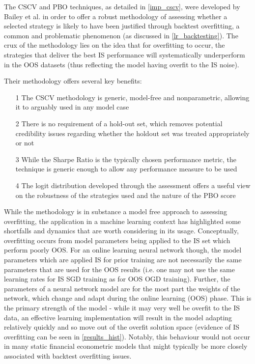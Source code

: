 \documentclass[a4paper,11pt,oneside]{article}
\theoremstyle{plain}
\theoremstyle{definition}
\begin{document}
	The CSCV and PBO techniques, as detailed in \ref{imp_cscv}, were developed by Bailey et al. \cite{BailyPBO} in order to offer a robust methodology of assessing whether a selected strategy is likely to have been justified through backtest overfitting, a common and problematic phenomenon (as discussed in \ref{lr_backtesting}). The crux of the methodology lies on the idea that for overfitting to occur, the strategies that deliver the best IS performance will systematically underperform in the OOS datasets (thus reflecting the model having overfit to the IS noise).\newline
	
	Their methodology offers several key benefits:
	\begin{itemize}
		\item[1] The CSCV methodology is generic, model-free and nonparametric, allowing it to arguably used in any model case
		\item[2] There is no requirement of a hold-out set, which removes potential credibility issues regarding whether the holdout set was treated appropriately or not
		\item[3] While the Sharpe Ratio is the typically chosen performance metric, the technique is generic enough to allow any performance measure to be used
		\item[4] The logit distribution developed through the assessment offers a useful view on the robustness of the strategies used and the nature of the PBO score
	\end{itemize}
	
	\texttt{}\newline
	While the methodology is in substance a model free approach to assessing overfitting, the application in a machine learning context has highlighted some shortfalls and dynamics that are worth considering in its usage. Conceptually, overfitting occurs from model parameters being applied to the IS set which perform poorly OOS. For an online learning neural network though, the model parameters which are applied IS for prior training are not necessarily the same parameters that are used for the OOS results (i.e. one may not use the same learning rates for IS SGD training as for OOS OGD training). Further, the parameters of a neural network model are for the most part the weights of the network, which change and adapt during the online learning (OOS) phase. This is the primary strength of the model - while it may very well be overfit to the IS data, an effective learning implementation will result in the model adapting relatively quickly and so move out of the overfit solution space (evidence of IS overfitting can be seen in \ref{results_hist}). Notably, this behaviour would not occur in many static financial econometric models that might typically be more closely associated with backtest overfitting issues.\newline 
	
\end{document}
